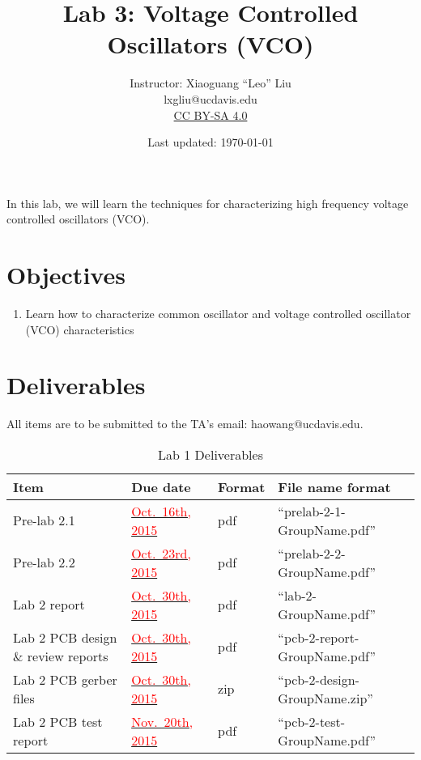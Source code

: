 \documentclass[letterpaper, 11pt]{article}
\newcommand{\due}[1]{\href{https://github.com/ucdart/UCD-EEC134/blob/master/support/schedule/eec134-schedule.pdf}{\textcolor{red}{#1}}}
\begin{document}
\title{Lab 3: Voltage Controlled Oscillators (VCO)}
\author{Instructor: Xiaoguang ``Leo'' Liu\\lxgliu@ucdavis.edu \\
	\small \href{http://creativecommons.org/licenses/by-sa/4.0/}{CC BY-SA 4.0}}
\date{Last updated: \today}

\maketitle

In this lab, we will learn the techniques for characterizing high frequency voltage controlled oscillators (VCO). 

\section{Objectives}

\begin{enumerate}[itemsep=0.1ex]
	\item Learn how to characterize common oscillator and voltage controlled oscillator (VCO) characteristics	
\end{enumerate}



\newpage
\section{Deliverables}
All items are to be submitted to the TA's email: haowang@ucdavis.edu.  

\vspace{0.5cm}

\begin{table}[h]
	\footnotesize
	\caption{Lab 1 Deliverables}
	\renewcommand{\arraystretch}{1.2}
	\begin{tabular}{|m{1in}|l|m{0.45in}|m{2in}|}
		\hline
		\textbf{Item} & \textbf{Due date} & \textbf{Format} & \textbf{File name format} \\
		\hline \hline
		Pre-lab 2.1 & \due{Oct.~16th, 2015} & pdf & ``prelab-2-1-GroupName.pdf'' \\
		\hline
		Pre-lab 2.2 & \due{Oct.~23rd, 2015} & pdf & ``prelab-2-2-GroupName.pdf''\\
		\hline
		Lab 2 report & \due{Oct.~30th, 2015} & pdf & ``lab-2-GroupName.pdf''\\
		\hline
		Lab 2 PCB design \& review reports & \due{Oct.~30th, 2015} & pdf & ``pcb-2-report-GroupName.pdf''\\
		\hline
		Lab 2 PCB gerber files & \due{Oct.~30th, 2015} & zip & ``pcb-2-design-GroupName.zip''\\
		\hline
		Lab 2 PCB test report & \due{Nov.~20th, 2015} & pdf & ``pcb-2-test-GroupName.pdf''\\
		\hline
	\end{tabular}
\end{table}
\end{document}
